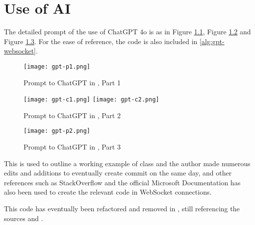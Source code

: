 \chapter{Use of AI}
The detailed prompt of the use of ChatGPT 4o \autocite{gpt-websocket} is as in Figure \ref{fig:gpt-websocket-1}, Figure \ref{fig:gpt-websocket-2} and Figure \ref{fig:gpt-websocket-3}. For the ease of reference, the code is also included in \ref{alg:gpt-websocket}.

\begin{figure}[!ht]
    \centering

    \texttt{[image: gpt-p1.png]}
    \caption[Prompt to ChatGPT in \autocite{gpt-websocket}, Part 1]{Prompt to ChatGPT in \autocite{gpt-websocket}, Part 1}
    \label{fig:gpt-websocket-1}
\end{figure}

\begin{figure}[!ht]
    \centering

    \texttt{[image: gpt-c1.png]}
    \texttt{[image: gpt-c2.png]}

    \caption[Prompt to ChatGPT in \autocite{gpt-websocket}, Part 2]{Prompt to ChatGPT in \autocite{gpt-websocket}, Part 2}
    \label{fig:gpt-websocket-2}
\end{figure}

\begin{figure}[!ht]
    \centering

    \texttt{[image: gpt-p2.png]}

    \caption[Prompt to ChatGPT in \autocite{gpt-websocket}, Part 3]{Prompt to ChatGPT in \autocite{gpt-websocket}, Part 3}
    \label{fig:gpt-websocket-3}
\end{figure}

This is used to outline a working example of  class and the author made numerous edits and additions to eventually create commit  on the same day, and other references such as StackOverflow \autocite{stackoverflow-websocket-demo}\autocite{stackoverflow-websocket-demo-2} and the official Microsoft Documentation \autocite{dotnet-reference-clientwebsocket} has also been used to create the relevant code in WebSocket connections.

This code has eventually been refactored and removed in , still referencing the sources \autocite{stackoverflow-websocket-demo} and \autocite{stackoverflow-websocket-demo-2}.